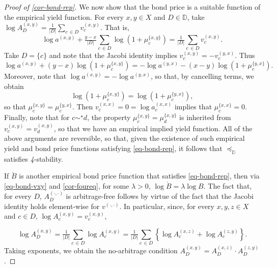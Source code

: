 \documentclass[12pt,a4paper,twoside]{article}
\newcommand{\mbbd}{{\mathds D}}
\newcommand{\xx}{(x,x)}
\newcommand{\xy}{{(x, y)}}
\newcommand{\yx}{{(y, x)}}
\newcommand{\zy}{{(z,y)}}
\newcommand{\xz}{{(x,z)}}
\newcommand{\dd}{{(\cdot,\cdot)}}
\newcommand{\stability}{\textit{4}-\textup{{stability}}}
\begin{document}
\begin{proof}[Proof of \cref{cor-bond-rep}]
We now show that the bond price is a suitable function of the empirical yield
  function.  For every $x,y \in X$ and $D \in \mbbd$, take $\log
  {A}^{\xy}_{D} = \tfrac{1}{\lvert D\rvert}\sum_{c\,\in D}v^{\xy}_{c}$. 
  That is,
  \begin{equation*}\log a^{\xy} +
  \tfrac{y - x}{\lvert D\rvert} \sum_{c\,\in D}\log
  \left(1+\mu^{\{x,y\}}_{c}\right) = \tfrac{1}{\lvert D\rvert}\sum_{c\,\in D} v^{\xy}_{c}. \end{equation*}
Take $D = \{c\}$ and note that the Jacobi identity implies $v^{\xy}_c = -
  v^{\yx}_c$. Thus
  \begin{equation*}\log a^{\xy} + (y - x) \log \left(1+\mu^{\{x,y\}}_{c}\right) = -\log
  a^{\yx} - (x - y) \log \left(1+\mu^{\{y,x\}}_{c}\right). \end{equation*}
Moreover, note
  that $\log a^{\xy} = -\log a^{\yx}$, so that, by cancelling terms, we obtain
  \begin{equation}\label{eq-mu-sym} \log \left(1+\mu^{\{x,y\}}_{c}\right)
    = \log \left(1+\mu^{\{y,x\}}_{c}\right),
  \end{equation}
so that $\mu^{\{x,y\}}_{c} = \mu^{\{y,x\}}_{c}$.
  Then $v^{\xx}_{c} = 0 = \log a^{\xx}_{c} $ implies that $\mu^{\{x,x\}}_{c} = 0$.
 Finally, note that for $c \sim^{\star} d$, the property $\mu^{\{x,y\}}_{c} =
 \mu^{\{x,y\}}_{d}$ is inherited from $v^{\xy}_{c} = v^{\xy}_{d}$, so that we
 have an empirical implied yield function. All of the above arguments are
  reversible, so that, given the existence of such empirical yield and bond
  price functions satisfying \eqref{eq-bond-rep}, it follows that
  $\preceq_{\mbbd}$ satisfies \stability.

If $\acute{B}$ is another empirical bond price function that satisfies
  \eqref{eq-bond-rep}, then via \cref{eq-bond-vxy} and \cref{cor-foureq}, for
  some $\lambda >0$, $\log \acute{B} = \lambda \log B$.  The fact that, for
  every $D$, ${A}^{\dd}_{D}$ is arbitrage-free follows by virtue of the fact
  that the Jacobi identity holds element-wise for $v^{\dd}$.  In particular,
  since, for every $x, y , z \in X$ and $c \in D$, $\log {A}^{\xy}_{c} =
  v^{\xy}_{c}$, 

  \begin{equation*}
    \log {A}^{\xy}_{D} = \tfrac{1}{\lvert D\rvert}\sum_{c\,\in D}\log
    {A}^{\xy}_c
  = \tfrac{1}{\lvert D\rvert}\sum_{c\,\in D} \left\{ \log {A}^{\xz}_c + \log
    {A}^{\zy}_c \right\}.
  \end{equation*} 
Taking exponents, we obtain the no-arbitrage condition ${A}^{\xy}_{D} =
{A}^{\xz}_{D} \cdot {A}^{\zy}_{D}$.
\end{proof}
\end{document}
